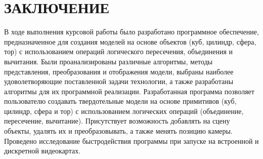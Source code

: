 \section*{ЗАКЛЮЧЕНИЕ}
В  ходе  выполнения  курсовой работы  было  разработано  программное обеспечение, предназначенное для создания моделей на основе объектов (куб, цилиндр, сфера, тор) с использованием операций логического пересечения, объединения и 
вычитания.  
Были  проанализированы  различные  алгоритмы,  методы  представления, 
преобразования  и  отображения  модели,  выбраны  наиболее  удоволетворяющие  поставленной  задачи  технологии,  а  также  разработаны  алгоритмы  для  их 
программной реализации. 
Разработанная программа позволяет пользователю создавать твердотельные модели на основе примитивов (куб, цилиндр, сфера и тор) с использованием логических операций (объединение, пересечение, вычитание). 
Присутствует возможность добавлять на сцену объекты, удалять их и преобразовывать, а также менять позицию камеры.
Проведено исследование быстродействия программы при запуске на встроенной и дискретной видеокартах.
\pagebreak
